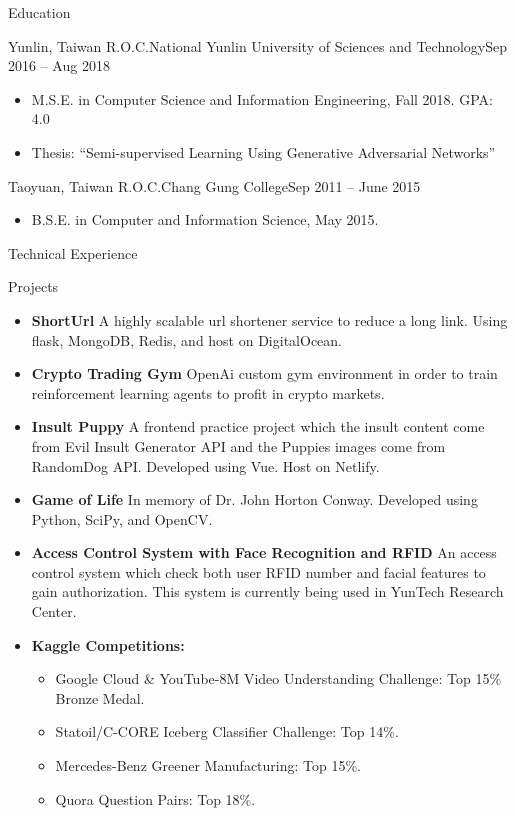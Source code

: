 \documentclass[]{mcdowellcv}
\begin{document}
	\begin{cvsection}{Education}
		\begin{cvsubsection}{Yunlin, Taiwan R.O.C.}{National Yunlin University of Sciences and Technology}{Sep 2016 -- Aug 2018}
			\bigskip
			\begin{itemize}
				\item M.S.E. in Computer Science and Information Engineering, Fall 2018.  GPA: 4.0
				\item Thesis: “Semi-supervised Learning Using Generative Adversarial Networks”
			\end{itemize}
		\end{cvsubsection}
		\begin{cvsubsection}{Taoyuan, Taiwan R.O.C.}{Chang Gung College}{Sep 2011 -- June 2015}
			\begin{itemize}
				\item B.S.E. in Computer and Information Science, May 2015. 
			\end{itemize}
		\end{cvsubsection}
	\end{cvsection}
	
	\begin{cvsection}{Technical Experience}
		\begin{cvsubsection}{Projects}{}{}
			\begin{itemize}
				\item \textbf{ShortUrl}  A highly scalable url shortener service to reduce a long link. Using flask, MongoDB, Redis, and host on DigitalOcean.
				\item \textbf{Crypto Trading Gym}  OpenAi custom gym environment in order to train reinforcement learning agents to profit in crypto markets.
				\item \textbf{Insult Puppy}  A frontend practice project which the insult content come from Evil Insult Generator API and the Puppies images come from RandomDog API. Developed using Vue. Host on Netlify.
				\item \textbf{Game of Life}  In memory of Dr. John Horton Conway. Developed using Python, SciPy, and OpenCV.
				\item \textbf{Access Control System with Face Recognition and RFID}  An access control system which check both user RFID number and facial features to gain authorization. This system is currently being used in YunTech Research Center.
				\item \textbf{Kaggle Competitions:}
					\begin{itemize}
						\item Google Cloud \& YouTube-8M Video Understanding Challenge: Top 15\% Bronze Medal.
						\item Statoil/C-CORE Iceberg Classifier Challenge: Top 14\%.
						\item Mercedes-Benz Greener Manufacturing: Top 15\%.
						\item Quora Question Pairs: Top 18\%.
					\end{itemize}
			\end{itemize}
		\end{cvsubsection}
	\end{cvsection}
	
\end{document}
